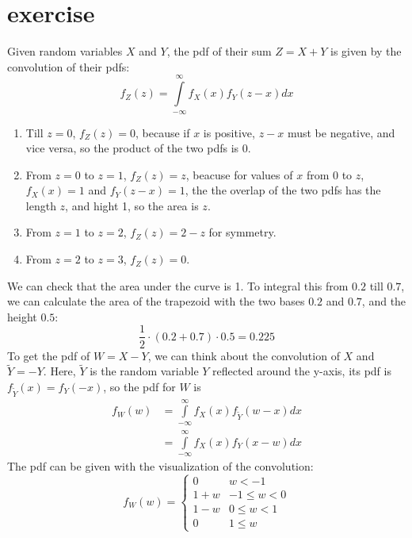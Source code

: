 \documentclass{article}
\begin{document}
\section{exercise}
Given random variables $X$ and $Y$, the pdf of their sum $Z = X + Y$
is given by the convolution of their pdfs:
\[
    {f_Z}\left( z \right) = \int\limits_{ - \infty }^\infty  {{f_X}\left( x \right){f_Y}\left( {z - x} \right)dx}
\]
\begin{enumerate}
    \item Till $z = 0$, $f_Z(z) = 0$, because if $x$ is positive, $z-x$ must be negative,
          and vice versa, so the product of the two pdfs is 0.
    \item From $z = 0$ to $z = 1$, $f_Z(z) = z$,
          beacuse for values of $x$ from 0 to $z$, $f_X(x) = 1$ and $f_Y(z-x) = 1$,
          the the overlap of the two pdfs has the length $z$, and hight 1, so the area is $z$.
    \item From $z = 1$ to $z = 2$, $f_Z(z) = 2 - z$ for symmetry.
    \item From $z = 2$ to $z = 3$, $f_Z(z) = 0$.
\end{enumerate}
We can check that the area under the curve is 1. To integral this from $0.2$ till $0.7$,
we can calculate the area of the trapezoid with the two bases $0.2$ and $0.7$,
and the height $0.5$:
\[
    \frac{1}{2} \cdot (0.2 + 0.7) \cdot 0.5 = 0.225
\]
To get the pdf of $W = X-Y$, we can think about the convolution of $X$ and $\tilde{Y}=-Y$.
Here, $\tilde{Y}$ is the random variable $Y$ reflected around the y-axis,
its pdf is $f_{\tilde{Y}}(x) = f_Y(-x)$, so the pdf for $W$ is
\[
    \begin{aligned}
        {f_W}\left( w \right) & = \int\limits_{ - \infty }^\infty  {{f_X}\left( x \right){f_{\tilde{Y}}}\left( {w - x} \right)dx} \\
                              & = \int\limits_{ - \infty }^\infty  {{f_X}\left( x \right){f_Y}\left( {x - w} \right)dx}
    \end{aligned}
\]
The pdf can be given with the visualization of the convolution:
\[{f_W}\left( w \right) = \left\{ {\begin{array}{*{20}{c}}
                0     & w < -1        \\
                1+w   & -1 \leq w < 0 \\
                1 - w & 0 \leq w < 1  \\
                0     & 1 \leq w
            \end{array}} \right.\]
\end{document}
